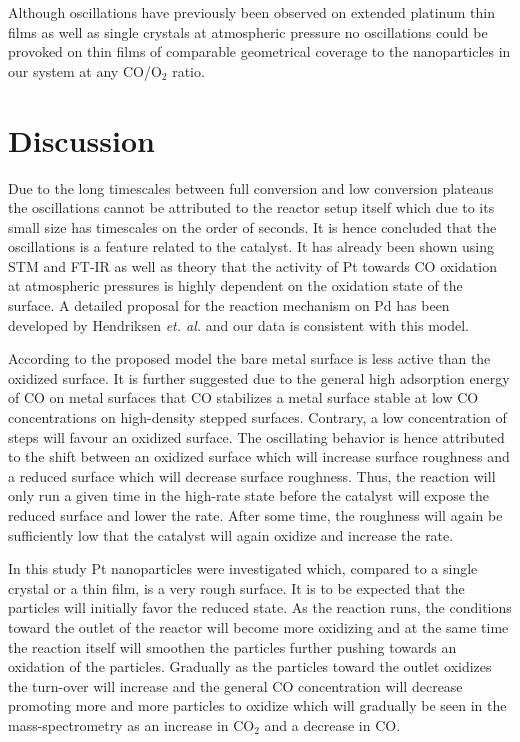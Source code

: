 \documentclass[8.5pt,twoside,twocolumn]{article}
\begin{document}
Although oscillations have previously been observed on extended platinum thin films \cite{Singh2010} as well as single crystals\cite{Hendriksen2005} at atmospheric pressure no oscillations could be provoked on thin films of comparable geometrical coverage to the nanoparticles in our system at any CO/O$_2$ ratio.  

\section{Discussion}
Due to the long timescales between full conversion and low conversion plateaus the oscillations cannot be attributed to the reactor setup itself which due to its small size has timescales on the order of seconds. It is hence concluded that the oscillations is a feature related to the catalyst. It has already been shown using STM \cite{Hendriksen2002} and FT-IR \cite{Carlsson2006} as well as theory \cite{Gong2004} that the activity of Pt towards CO oxidation at atmospheric pressures is highly dependent on the oxidation state of the surface. A detailed proposal for the reaction mechanism on Pd has been developed by Hendriksen \textit{et. al.}\cite{Hendriksen2010} and our data is consistent with this model.

According to the proposed model the bare metal surface is less active than the oxidized surface. It is further suggested due to the general high adsorption energy of CO on metal surfaces that CO stabilizes a metal surface stable at low CO concentrations on high-density stepped surfaces. Contrary, a low concentration of steps will favour an oxidized surface. The oscillating behavior is hence attributed to the shift between an oxidized surface which will increase surface roughness and a reduced surface which will decrease surface roughness. Thus, the reaction will only run a given time in the high-rate state before the catalyst will expose the reduced surface and lower the rate. After some time, the roughness will again be sufficiently low that the catalyst will again oxidize and increase the rate.

In this study Pt nanoparticles were investigated which, compared to a single crystal or a thin film, is a very rough surface. It is to be expected that the particles will initially favor the reduced state. As the reaction runs, the conditions toward the outlet of the reactor will become more oxidizing and at the same time the reaction itself will smoothen the particles further pushing towards an oxidation of the particles. Gradually as the particles toward the outlet oxidizes the turn-over will increase and the general CO concentration will decrease promoting more and more particles to oxidize which will gradually be seen in the mass-spectrometry as an increase in CO$_2$ and a decrease in CO. 
\end{document}
